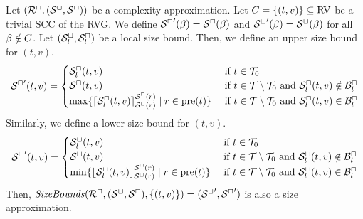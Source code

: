 \begin{theorem}
  Let $({\mathcal{R}^\sqcap}, {({\mathcal{S}^\sqcup}, {\mathcal{S}^\sqcap})})$ be a complexity approximation.
  Let $C = \lbrace (t,v) \rbrace \subseteq \text{RV}$ be a trivial SCC of the RVG.
  We define ${\mathcal{S}^\sqcap}'(\beta) = {\mathcal{S}^\sqcap}(\beta)$ and ${\mathcal{S}^\sqcup}'(\beta) = {\mathcal{S}^\sqcup}(\beta)$ for all $\beta \notin C$.
  Let ${({\mathcal{S}^\sqcup_l}, {\mathcal{S}^\sqcap_l})}$ be a local size bound.
  Then, we define an upper size bound for $(t,v)$. 
  \[ {\mathcal{S}^\sqcap}'(t,v) =
  \begin{cases}
    {\mathcal{S}^\sqcap_l}(t, v) & \text{ if } t \in \mathcal{T}_0 \\
    {\mathcal{S}^\sqcap}(t, v) & \text{ if } t \in \mathcal{T} \setminus \mathcal{T}_0 \text{ and } {\mathcal{S}^\sqcap_l}(t,v) \notin \mathcal{B}^\sqcap_l \\
    \max \lbrace  \lceil {\mathcal{S}^\sqcap_l}(t,v) \rceil^{{\mathcal{S}^\sqcap}(r)}_{{\mathcal{S}^\sqcup}(r)} \mid r \in \text{pre}(t) \rbrace & \text{ if } t \in \mathcal{T} \setminus \mathcal{T}_0 \text{ and } {\mathcal{S}^\sqcap_l}(t,v) \in \mathcal{B}^\sqcap_l \\
  \end{cases}
  \]
  Similarly, we define a lower size bound for $(t,v)$.
  \[ {\mathcal{S}^\sqcup}'(t,v) =
  \begin{cases}
    {\mathcal{S}^\sqcup_l}(t, v) & \text{ if } t \in \mathcal{T}_0 \\
    {\mathcal{S}^\sqcup}(t, v) & \text{ if } t \in \mathcal{T} \setminus \mathcal{T}_0 \text{ and } {\mathcal{S}^\sqcup_l}(t,v) \notin \mathcal{B}^\sqcap_l \\
    \min \lbrace  \lfloor {\mathcal{S}^\sqcup_l}(t,v) \rfloor^{{\mathcal{S}^\sqcap}(r)}_{{\mathcal{S}^\sqcup}(r)} \mid r \in \text{pre}(t) \rbrace & \text{ if } t \in \mathcal{T} \setminus \mathcal{T}_0 \text{ and } {\mathcal{S}^\sqcup_l}(t,v) \in \mathcal{B}^\sqcap_l \\
  \end{cases}
  \]
  Then, $\mathit{SizeBounds}({\mathcal{R}^\sqcap}, {({\mathcal{S}^\sqcup}, {\mathcal{S}^\sqcap})}, \lbrace (t,v) \rbrace) = ({\mathcal{S}^\sqcup}', {\mathcal{S}^\sqcap}')$ is also a size approximation.
\end{theorem}
